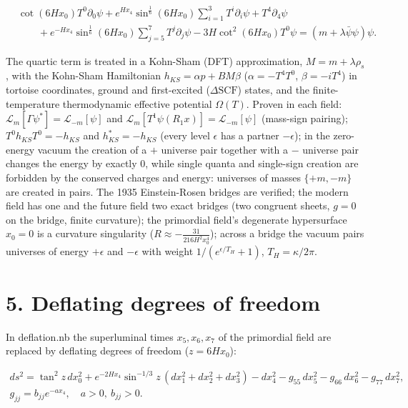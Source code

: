 \documentclass[10pt]{article}
\makeatletter
\newcommand\keepnext{\par\nopagebreak\@nobreaktrue\everypar{\@nobreakfalse\everypar{}}}
\makeatother
\begin{document}
\[
\begin{aligned}
&\cot(6Hx_0)T^0\partial_0\psi + e^{Hx_4}\sin^{\frac16}(6Hx_0)\sum_{i=1}^3T^i\partial_i\psi + T^4\partial_4\psi \\
&\qquad + e^{-Hx_4}\sin^{\frac16}(6Hx_0)\sum_{j=5}^7T^j\partial_j\psi - 3H\cot^2(6Hx_0)T^0\psi = (m+\lambda\bar\psi\psi)\psi .
\end{aligned}
\]

The quartic term is treated in a Kohn-Sham (DFT) approximation, $M = m + \lambda\rho_s$, with the Kohn-Sham Hamiltonian $h_{KS} = \alpha p + BM\beta$ ($\alpha = -T^4T^0$, $\beta = -iT^4$) in tortoise coordinates, ground and first-excited ($\Delta\mathrm{SCF}$) states, and the finite-temperature thermodynamic effective potential $\Omega(T)$. Proven in each field: $\mathcal L_m[\Gamma\psi^*] = \mathcal L_{-m}[\psi]$ and $\mathcal L_m[T^1\psi(R_1x)] = \mathcal L_{-m}[\psi]$ (mass-sign pairing); $T^0h_{KS}T^0 = -h_{KS}$ and $h_{KS}^* = -h_{KS}$ (every level $\epsilon$ has a partner $-\epsilon$); in the zero-energy vacuum the creation of a $+$ universe pair together with a $-$ universe pair changes the energy by exactly 0, while single quanta and single-sign creation are forbidden by the conserved charges and energy: universes of masses $\{+m,-m\}$ are created in pairs. The 1935 Einstein-Rosen bridges are verified; the modern field has one and the future field two exact bridges (two congruent sheets, $g = 0$ on the bridge, finite curvature); the primordial field's degenerate hypersurface $x_0 = 0$ is a curvature singularity ($R \approx -\frac{31}{216H^2x_0^4}$); across a bridge the vacuum pairs universes of energy $+\epsilon$ and $-\epsilon$ with weight $1/(e^{\epsilon/T_H}+1)$, $T_H = \kappa/2\pi$.


\section*{5. Deflating degrees of freedom}

In deflation.nb the superluminal times $x_5, x_6, x_7$ of the primordial field are replaced by deflating degrees of freedom ($z = 6Hx_0$):\keepnext


\[
\begin{gathered}
ds^2 = \tan^2 z\,dx_0^2 + e^{-2Hx_4}\sin^{-1/3}z\,(dx_1^2 + dx_2^2 + dx_3^2) - dx_4^2 - g_{55}\,dx_5^2 - g_{66}\,dx_6^2 - g_{77}\,dx_7^2, \\
g_{jj} = b_{jj}e^{-ax_4},\quad a > 0,\ b_{jj} > 0 .
\end{gathered}
\]
\end{document}
